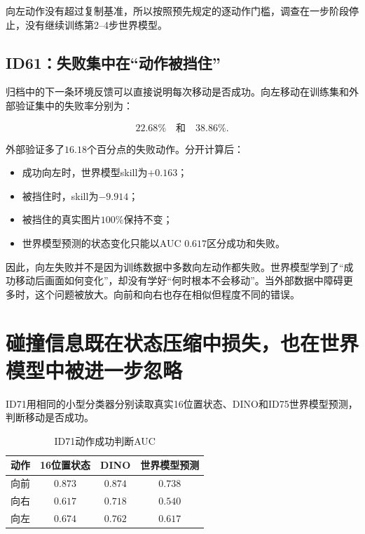 \documentclass[UTF8,11pt,a4paper,fontset=none]{ctexart}
\begin{document}
向左动作没有超过复制基准，所以按照预先规定的逐动作门槛，调查在一步阶段停止，没有继续训练第2--4步世界模型。

\subsection{ID61：失败集中在“动作被挡住”}

归档中的下一条环境反馈可以直接说明每次移动是否成功。向左移动在训练集和外部验证集中的失败率分别为：

\begin{equation}
  22.68\% \quad\text{和}\quad 38.86\%.
\end{equation}

外部验证多了$16.18$个百分点的失败动作。分开计算后：

\begin{itemize}
  \item 成功向左时，世界模型skill为$+0.163$；
  \item 被挡住时，skill为$-9.914$；
  \item 被挡住的真实图片$100\%$保持不变；
  \item 世界模型预测的状态变化只能以AUC $0.617$区分成功和失败。
\end{itemize}

因此，向左失败并不是因为训练数据中多数向左动作都失败。世界模型学到了“成功移动后画面如何变化”，却没有学好“何时根本不会移动”。当外部数据中障碍更多时，这个问题被放大。向前和向右也存在相似但程度不同的错误。

\section{碰撞信息既在状态压缩中损失，也在世界模型中被进一步忽略}

ID71用相同的小型分类器分别读取真实16位置状态、DINO和ID75世界模型预测，判断移动是否成功。

\begin{table}[htbp]
\centering
\caption{ID71动作成功判断AUC}
\small
\begin{tabular}{lccc}
\toprule
\textbf{动作} & \textbf{16位置状态} & \textbf{DINO} & \textbf{世界模型预测} \\
\midrule
向前 & $0.873$ & $0.874$ & $0.738$ \\
向右 & $0.617$ & $0.718$ & $0.540$ \\
向左 & $0.674$ & $0.762$ & $0.617$ \\
\bottomrule
\end{tabular}
\end{table}
\end{document}
